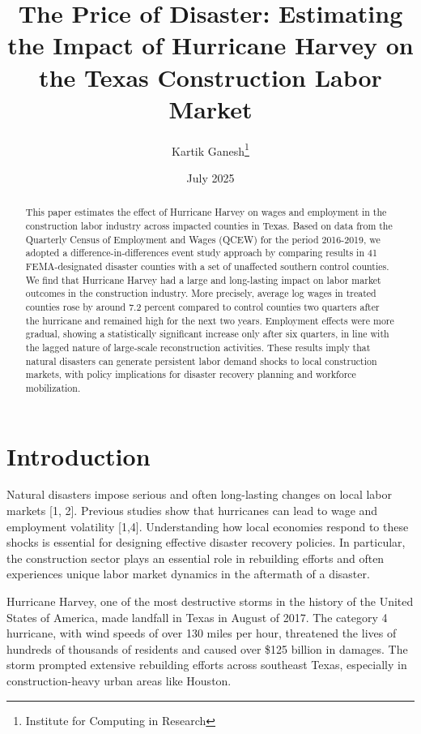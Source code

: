 \documentclass{article}
\title{The Price of Disaster: Estimating the Impact of Hurricane Harvey on the Texas Construction Labor Market}
\author{
  Kartik Ganesh\thanks{Institute for Computing in Research}
}
\date{July 2025}
\begin{document}
\maketitle

\begin{abstract}
This paper estimates the effect of Hurricane Harvey on wages and employment in the construction labor industry across impacted counties in Texas. Based on data from the Quarterly Census of Employment and Wages (QCEW) for the period 2016-2019, we adopted a difference-in-differences event study approach by comparing results in 41 FEMA-designated disaster counties with a set of unaffected southern control counties. We find that Hurricane Harvey had a large and long-lasting impact on labor market outcomes in the construction industry. More precisely, average log wages in treated counties rose by around 7.2 percent compared to control counties two quarters after the hurricane and remained high for the next two years. Employment effects were more gradual, showing a statistically significant increase only after six quarters, in line with the lagged nature of large-scale reconstruction activities. These results imply that natural disasters can generate persistent labor demand shocks to local construction markets, with policy implications for disaster recovery planning and workforce mobilization.
\end{abstract}

\section{Introduction}
Natural disasters impose serious and often long-lasting changes on local labor markets [1, 2]. Previous studies show that hurricanes can lead to wage and employment volatility [1,4]. Understanding how local economies respond to these shocks is essential for designing effective disaster recovery policies. In particular, the construction sector plays an essential role in rebuilding efforts and often experiences unique labor market dynamics in the aftermath of a disaster.

Hurricane Harvey, one of the most destructive storms in the history of the United States of America, made landfall in Texas in August of 2017. The category 4 hurricane, with wind speeds of over 130 miles per hour, threatened the lives of hundreds of thousands of residents and caused over \$125 billion in damages. The storm prompted extensive rebuilding efforts across southeast Texas, especially in construction-heavy urban areas like Houston.
\end{document}
